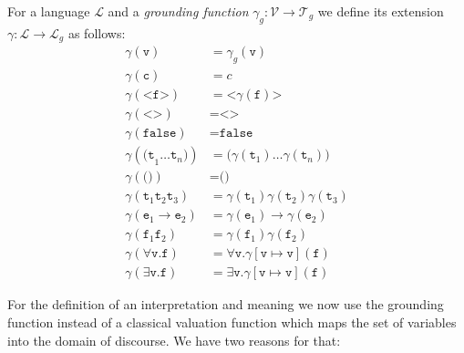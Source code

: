\begin{definition}
For a language $\mathcal{L}$ and a  \emph{grounding function} $\gamma_g: \mathcal{V}\rightarrow \mathcal{T}_g$ we define its extension
$\gamma:\mathcal{L}\rightarrow \mathcal{L}_g$ as follows: 
\begin{align*}
 \gamma(\texttt{v}) &= \gamma_g(\texttt{v})\\
 \gamma(\texttt{c}) &= c\\
 \gamma(\texttt{<f>}) &= \texttt{<}\gamma(\texttt{f})\texttt{>}\\
 \gamma(\texttt{<>}) &= \texttt{<>}\\
 \gamma(\texttt{false}) &= \texttt{false}\\
 \gamma(\texttt{(t}_1\ldots\texttt{t}_n\texttt{)})&= \texttt{(}\gamma(\texttt{t}_1)\ldots\gamma(\texttt{t}_n)\texttt{)}\\
 \gamma(\texttt{()})&=\texttt{()}\\
 \gamma(\texttt{t}_1\texttt{t}_2\texttt{t}_3) &= \gamma(\texttt{t}_1)\gamma(\texttt{t}_2)\gamma(\texttt{t}_3)\\
 \gamma(\texttt{e}_1\rightarrow \texttt{e}_2) &= \gamma(\texttt{e}_1)\rightarrow\gamma(\texttt{e}_2)\\
 \gamma(\texttt{f}_1\texttt{f}_2) &= \gamma(\texttt{f}_1)\gamma(\texttt{f}_2)\\
 \gamma(\forall \texttt{v}.\texttt{f}) &=  \forall \texttt{v}. \gamma[\texttt{v}\mapsto \texttt{v}](\texttt{f})\\
  \gamma(\exists \texttt{v}.\texttt{f}) &=  \exists \texttt{v}. \gamma[\texttt{v}\mapsto \texttt{v}](\texttt{f})
\end{align*}
\end{definition}

For the definition of an interpretation and meaning we now use the grounding function instead of a classical 
valuation function which maps the set of variables into the domain of discourse. We have two reasons for that:

